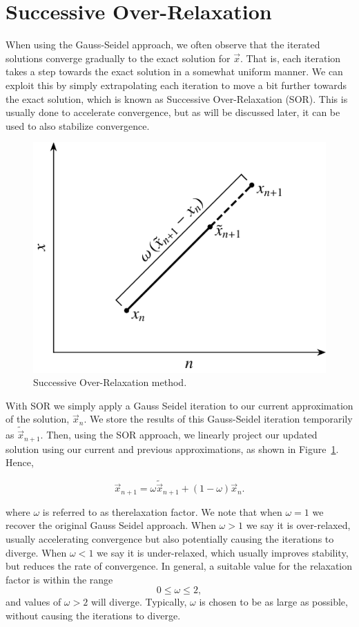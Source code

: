 \section{Successive Over-Relaxation}
When using the Gauss-Seidel approach, we often observe that the iterated solutions converge gradually to the exact solution for $\vec{x}$. That is, each iteration takes a step towards the exact solution in a somewhat uniform manner. We can exploit this by simply extrapolating each iteration to move a bit further towards the exact solution, which is known as Successive Over-Relaxation (SOR). This is usually done to accelerate convergence, but as will be discussed later, it can be used to also stabilize convergence.
\begin{figure}[htbp]
	\centering
	\includegraphics[width=0.5\linewidth]{Pictures/itermethods_sor}
	\caption{Successive Over-Relaxation method.}
	\label{fig:sor}
\end{figure}

With SOR we simply apply a Gauss Seidel iteration to our current approximation of the solution, $\vec{x}_n$. We store the results of this Gauss-Seidel iteration temporarily as $\tilde{\vec{x}}_{n+1}$. Then, using the SOR approach, we linearly project our updated solution using our current and previous approximations, as shown in Figure~\ref{fig:sor}. Hence,
\begin{eqBox}
\begin{equation}
	\vec{x}_{n+1} = \omega \tilde{\vec{x}}_{n+1} + (1-\omega) \vec{x}_n.
\end{equation}
\end{eqBox}
where $\omega$ is referred to as therelaxation factor. We note that when $\omega=1$ we recover the original Gauss Seidel approach. When $\omega>1$ we say it is over-relaxed, usually accelerating convergence but also potentially causing the iterations to diverge. When $\omega<1$ we say it is under-relaxed, which usually improves stability, but reduces the rate of convergence. In general, a suitable value for the relaxation factor is within the range
\begin{equation}
	0 \leq \omega \leq 2,
\end{equation}
and values of $\omega > 2$ will diverge. Typically, $\omega$ is chosen to be as large as possible, without causing the iterations to diverge.

